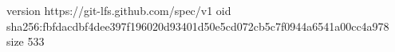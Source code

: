 version https://git-lfs.github.com/spec/v1
oid sha256:fbfdacdbf4dee397f196020d93401d50e5cd072cb5c7f0944a6541a00cc4a978
size 533

